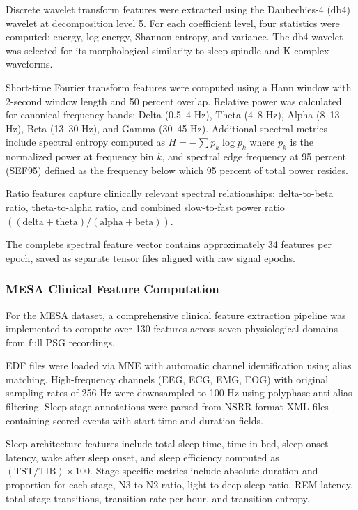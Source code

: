 \documentclass[pdflatex,sn-mathphys-num]{sn-jnl}%
\theoremstyle{thmstyleone}%
\theoremstyle{thmstyletwo}%
\theoremstyle{thmstylethree}%
\begin{document}
Discrete wavelet transform features were extracted using the Daubechies-4 (db4) wavelet at decomposition level 5. For each coefficient level, four statistics were computed: energy, log-energy, Shannon entropy, and variance. The db4 wavelet was selected for its morphological similarity to sleep spindle and K-complex waveforms.

Short-time Fourier transform features were computed using a Hann window with 2-second window length and 50 percent overlap. Relative power was calculated for canonical frequency bands: Delta (0.5--4 Hz), Theta (4--8 Hz), Alpha (8--13 Hz), Beta (13--30 Hz), and Gamma (30--45 Hz). Additional spectral metrics include spectral entropy computed as $H = -\sum p_k \log p_k$ where $p_k$ is the normalized power at frequency bin $k$, and spectral edge frequency at 95 percent (SEF95) defined as the frequency below which 95 percent of total power resides.

Ratio features capture clinically relevant spectral relationships: delta-to-beta ratio, theta-to-alpha ratio, and combined slow-to-fast power ratio $((\text{delta} + \text{theta}) / (\text{alpha} + \text{beta}))$.

The complete spectral feature vector contains approximately 34 features per epoch, saved as separate tensor files aligned with raw signal epochs.

\subsubsection{MESA Clinical Feature Computation}

For the MESA dataset, a comprehensive clinical feature extraction pipeline was implemented to compute over 130 features across seven physiological domains from full PSG recordings.

EDF files were loaded via MNE with automatic channel identification using alias matching. High-frequency channels (EEG, ECG, EMG, EOG) with original sampling rates of 256 Hz were downsampled to 100 Hz using polyphase anti-alias filtering. Sleep stage annotations were parsed from NSRR-format XML files containing scored events with start time and duration fields.

Sleep architecture features include total sleep time, time in bed, sleep onset latency, wake after sleep onset, and sleep efficiency computed as $(\text{TST} / \text{TIB}) \times 100$. Stage-specific metrics include absolute duration and proportion for each stage, N3-to-N2 ratio, light-to-deep sleep ratio, REM latency, total stage transitions, transition rate per hour, and transition entropy.
\end{document}
